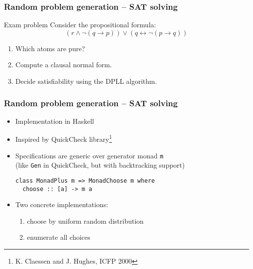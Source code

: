 \documentclass[xcolor={table}]{beamer}
\newcommand{\limpl}{\rightarrow}
\newcommand{\liff}{\leftrightarrow}
\begin{document}


\begin{frame}
    \frametitle{Random problem generation -- SAT solving}

    \begin{block}{Exam problem}
        Consider the propositional formula:
        \[
            (r \land \lnot (q \limpl p)) \lor (q \liff \lnot (p \limpl q))
        \]
        \vspace*{-1.5em}
        \begin{enumerate}
            \item Which atoms are pure?
            \item Compute a clausal normal form.
            \item Decide satisfiability using the DPLL algorithm.
        \end{enumerate}
    \end{block}
\end{frame}


\begin{frame}[fragile]
    \frametitle{Random problem generation -- SAT solving}

    \begin{itemize}
        \item
            Implementation in Haskell
        \item
            Inspired by QuickCheck library\footnote{K. Claessen and J. Hughes, ICFP 2000}

            \pause
        \item
            Specifications are generic over generator monad \texttt{m}
            \\
            (like \texttt{Gen} in QuickCheck, but with backtracking support)

\begin{lstlisting}
class MonadPlus m => MonadChoose m where
  choose :: [a] -> m a
\end{lstlisting}

            \pause
        \item
            Two concrete implementations:

            \begin{enumerate}
                \item choose by uniform random distribution
                \item enumerate all choices
            \end{enumerate}
    \end{itemize}
\end{frame}
\end{document}
